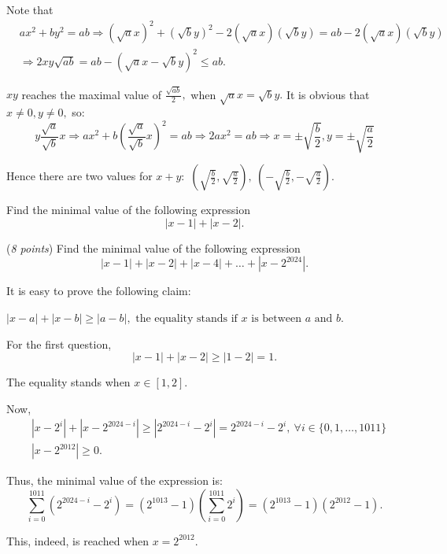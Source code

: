 \documentclass{article}
\begin{document}
\begin{soln}
    Note that
    \[
        \begin{aligned}
            &ax^2 + by^2 = ab \Rightarrow (\sqrt{a}x)^2 + (\sqrt{b}y)^2 - 2(\sqrt{a}x)(\sqrt{b}y) = ab - 2(\sqrt{a}x)(\sqrt{b}y)\\
            &\Rightarrow 2xy\sqrt{ab} = ab - (\sqrt{a}x - \sqrt{b}y)^2 \le ab.
        \end{aligned}
    \]

    $xy$ reaches the maximal value of $\frac{\sqrt{ab}}{2},$ when $\sqrt{a}x = \sqrt{b}y.$
    It is obvious that $x \ne 0, y \ne 0,$ so:
    \[
        y \frac{\sqrt{a}}{\sqrt{b}}x \Rightarrow ax^2 + b\left(\frac{\sqrt{a}}{\sqrt{b}}x\right)^2 = ab \Rightarrow 2ax^2 = ab \Rightarrow x = \pm \sqrt{\frac{b}{2}}, y = \pm \sqrt{\frac{a}{2}}
    \]

    Hence there are two values for $x+y:$ $\boxed{(\sqrt{\frac{b}{2}}, \sqrt{\frac{a}{2}}),\ (-\sqrt{\frac{b}{2}}, -\sqrt{\frac{a}{2}}).}$
\end{soln}

\begin{problem}
    Find the minimal value of the following expression
    \[
        |x - 1| + |x - 2|.
    \]

    (\textit{8 points}) Find the minimal value of the following expression
    \[
        |x - 1| + |x - 2| + |x - 4| + \ldots + |x - 2^{2024}|.
    \]
\end{problem}

\begin{soln}
    It is easy to prove the following claim:
    \begin{claim*}
        $|x-a| + |x-b| \ge |a-b|, \text{\ the equality stands if\ } x \text{\ is between\ } a \text{\ and\ } b.$
    \end{claim*}

    For the first question,
    \[
        |x - 1| + |x - 2| \ge |1-2| = \boxed{1.}
    \]

    The equality stands when $x \in [1, 2].$

    Now,
    \[
        \begin{aligned}
            &|x - 2^i| + |x-2^{2024-i}| \ge |2^{2024-i} - 2^i| = 2^{2024-i} - 2^i,\ \forall i \in \{0, 1, \ldots, 1011\}\\
            &|x - 2^{2012}| \ge 0.
        \end{aligned}
    \]

    Thus, the minimal value of the expression is:
    \[
        \sum_{i=0}^{1011} (2^{2024-i} - 2^i) = (2^{1013}-1)(\sum_{i=0}^{1011} 2^i) = \boxed{(2^{1013}-1)(2^{2012}-1).}
    \]
    
    This, indeed, is reached when $x = 2^{2012}.$
\end{soln}
\end{document}
